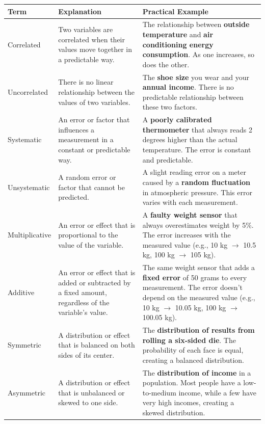 \documentclass{article}
\begin{document}
\begin{center}
\begin{tabular}{|m{2.5cm}|m{3cm}|m{7cm}|} 
 \hline 
 \textbf{Term} & \textbf{Explanation} & \textbf{Practical Example} \\ 
 \hline 
 Correlated & Two variables are correlated when their values move together in a predictable way. & The relationship between \textbf{outside temperature} and \textbf{air conditioning energy consumption}. As one increases, so does the other. \\ 
 \hline 
 Uncorrelated & There is no linear relationship between the values of two variables. & The \textbf{shoe size} you wear and your \textbf{annual income}. There is no predictable relationship between these two factors. \\ 
 \hline 
 Systematic & An error or factor that influences a measurement in a constant or predictable way. & A \textbf{poorly calibrated thermometer} that always reads 2 degrees higher than the actual temperature. The error is constant and predictable. \\ 
 \hline 
 Unsystematic & A random error or factor that cannot be predicted. & A slight reading error on a meter caused by a \textbf{random fluctuation} in atmospheric pressure. This error varies with each measurement. \\ 
 \hline 
 Multiplicative & An error or effect that is proportional to the value of the variable. & A \textbf{faulty weight sensor} that always overestimates weight by 5\%. The error increases with the measured value (e.g., 10 kg $\to$ 10.5 kg, 100 kg $\to$ 105 kg). \\ 
 \hline 
 Additive & An error or effect that is added or subtracted by a fixed amount, regardless of the variable's value. & The same weight sensor that adds a \textbf{fixed error} of 50 grams to every measurement. The error doesn't depend on the measured value (e.g., 10 kg $\to$ 10.05 kg, 100 kg $\to$ 100.05 kg). \\ 
 \hline 
 Symmetric & A distribution or effect that is balanced on both sides of its center. & The \textbf{distribution of results from rolling a six-sided die}. The probability of each face is equal, creating a balanced distribution. \\ 
 \hline 
 Asymmetric & A distribution or effect that is unbalanced or skewed to one side. & The \textbf{distribution of income} in a population. Most people have a low-to-medium income, while a few have very high incomes, creating a skewed distribution. \\ 
 \hline 
 \end{tabular}
\end{center}
\end{document}

